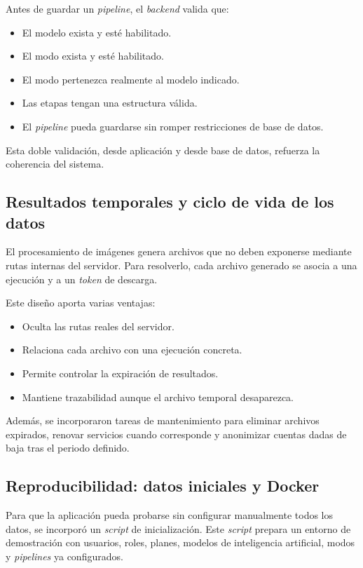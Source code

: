 Antes de guardar un \textit{pipeline}, el \textit{backend} valida que:

\begin{itemize}
	\item El modelo exista y esté habilitado.
	\item El modo exista y esté habilitado.
	\item El modo pertenezca realmente al modelo indicado.
	\item Las etapas tengan una estructura válida.
	\item El \textit{pipeline} pueda guardarse sin romper restricciones de base de datos.
\end{itemize}

Esta doble validación, desde aplicación y desde base de datos, refuerza la coherencia del sistema.

\subsection{Resultados temporales y ciclo de vida de los datos}

El procesamiento de imágenes genera archivos que no deben exponerse mediante rutas internas del servidor. Para resolverlo, cada archivo generado se asocia a una ejecución y a un \textit{token} de descarga.

Este diseño aporta varias ventajas:

\begin{itemize}
	\item Oculta las rutas reales del servidor.
	\item Relaciona cada archivo con una ejecución concreta.
	\item Permite controlar la expiración de resultados.
	\item Mantiene trazabilidad aunque el archivo temporal desaparezca.
\end{itemize}

Además, se incorporaron tareas de mantenimiento para eliminar archivos expirados, renovar servicios cuando corresponde y anonimizar cuentas dadas de baja tras el periodo definido.

\subsection{Reproducibilidad: datos iniciales y Docker}

Para que la aplicación pueda probarse sin configurar manualmente todos los datos, se incorporó un \textit{script} de inicialización. Este \textit{script} prepara un entorno de demostración con usuarios, roles, planes, modelos de inteligencia artificial, modos y \textit{pipelines} ya configurados.

